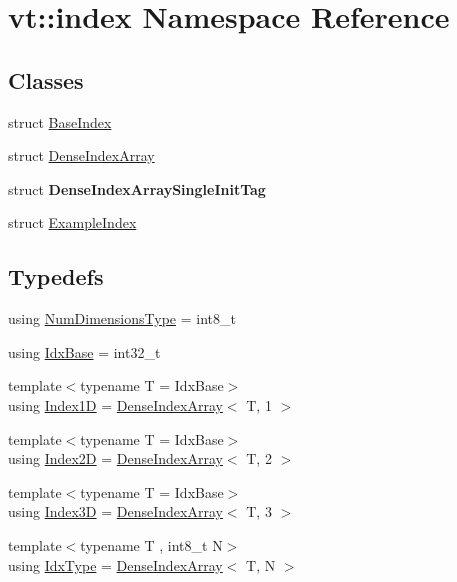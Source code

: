 \hypertarget{namespacevt_1_1index}{}\section{vt\+:\+:index Namespace Reference}
\label{namespacevt_1_1index}
\subsection*{Classes}
\begin{DoxyCompactItemize}
\item 
struct \hyperlink{structvt_1_1index_1_1_base_index}{Base\+Index}
\item 
struct \hyperlink{structvt_1_1index_1_1_dense_index_array}{Dense\+Index\+Array}
\item 
struct {\bfseries Dense\+Index\+Array\+Single\+Init\+Tag}
\item 
struct \hyperlink{structvt_1_1index_1_1_example_index}{Example\+Index}
\end{DoxyCompactItemize}
\subsection*{Typedefs}
\begin{DoxyCompactItemize}
\item 
using \hyperlink{namespacevt_1_1index_a97aa9370711425850c86bcb7a20d73e8}{Num\+Dimensions\+Type} = int8\+\_\+t
\item 
using \hyperlink{namespacevt_1_1index_a0dbb8d47463da27c1436e8e4ddb02743}{Idx\+Base} = int32\+\_\+t
\item 
{\footnotesize template$<$typename T  = Idx\+Base$>$ }\\using \hyperlink{namespacevt_1_1index_a091a4f5a7a2c993d9727eaa60cf67d81}{Index1D} = \hyperlink{structvt_1_1index_1_1_dense_index_array}{Dense\+Index\+Array}$<$ T, 1 $>$
\item 
{\footnotesize template$<$typename T  = Idx\+Base$>$ }\\using \hyperlink{namespacevt_1_1index_a8373801efc8343f24d6e8ba57df40a69}{Index2D} = \hyperlink{structvt_1_1index_1_1_dense_index_array}{Dense\+Index\+Array}$<$ T, 2 $>$
\item 
{\footnotesize template$<$typename T  = Idx\+Base$>$ }\\using \hyperlink{namespacevt_1_1index_a2c09a09f7346d370a0bcbbfb0d4459cd}{Index3D} = \hyperlink{structvt_1_1index_1_1_dense_index_array}{Dense\+Index\+Array}$<$ T, 3 $>$
\item 
{\footnotesize template$<$typename T , int8\+\_\+t N$>$ }\\using \hyperlink{namespacevt_1_1index_a939bace7aba6cd4a76b2c12a138c5991}{Idx\+Type} = \hyperlink{structvt_1_1index_1_1_dense_index_array}{Dense\+Index\+Array}$<$ T, N $>$
\end{DoxyCompactItemize}
